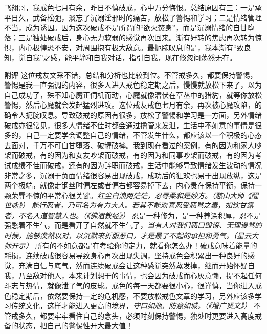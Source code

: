 \begin{case}
    飞翔哥，我戒色七月有余，昨日不慎破戒，心中万分悔恨。总结原因有三：一是承平日久，武备松弛，淡忘了沉溺淫邪时的痛苦，放松了警惕和学习；二是情绪管理不当，成为诱因。因为这次破戒不是所谓的“欲火焚身”，而是沉溺情绪的自甘堕落；三是独处破戒后，身心无力软弱的感觉再次回来。渐有好转的焦虑再次转为惊惧，内心极惶恐不安，对周围抱有极大敌意。最扼腕叹息的是，我本渐有“致良知，觉自我”之感，能平静和自我对话，指引自我，现在倏忽间荡然无存。

    \textbf{附评} 这位戒友文采不错，总结和分析也比较到位。不管戒多久，都要保持警惕，警惕是我一直强调的内容，很多人进入戒色稳定期之后，慢慢就放松下来了，以为自己成功了，殊不知心魔正伺机而动，心魔就像潜伏在草丛中的猎豹，就等你放松警惕，然后心魔就会发起猛烈进攻。这位戒友戒色七月有余，再次被心魔攻陷，的确令人扼腕叹息。导致破戒的原因有很多，放松了警惕和学习是一方面，另外情绪破戒亦很常见，很多人情绪不佳时都会通过撸管来发泄，生活中不如意的事情是很多的，自己一定要学会调整自己的情绪，不管发生什么，都应该以一个积极的心态去面对，千万不可自甘堕落、破罐破摔。我到现在看过的案例，有的因为和家人吵架而破戒，有的因为和女友吵架而破戒，有的因为和同事吵架而破戒，有的因为考试成绩不佳而破戒，还有的因为辞职而破戒，生活中能够导致情绪发生波动的情况非常之多，沉溺于负面情绪很容易出现破戒，成功后的狂欢也易于出现放纵，这是两个极端，就像走钢丝时偏左或者偏右都容易掉下去，内心贵在保持平衡，保持一颗荣辱不惊的平常心很关键。\textit{红尘白浪两茫茫，忍辱柔和是妙方。（憨山大师《醒世咏》）} \textit{能行忍者，乃可名为有力大人。若其不能欢喜忍受恶骂之毒，如饮甘露者，不名入道智慧人也。（《佛遗教经》）} 忍是一种修为，是一种养深积厚，忍不是强憋着不生气，而是看开了自然就不生气了，\textit{当有人对我们恶口毁谤、无理谩骂的时候，能够漠然以对，以沉默来折服恶口，才是最了不起的承担和勇气。（星云大师开示）} 所有的不如意都是在考验你的定力，就看你怎么办！破戒意味着能量的耗损，连续破戒很容易导致身心再次出现失调，坚持戒色会积累出一种良好的感觉，充满自信与底气，然而连续破戒会让这种感觉突然蒸发掉，继而开始怀疑自我，乃至敌对他人，本来计划想干的事情，也会因为破戒而心灰意懒，提不起任何斗志与热情，就像泄了气的皮球。戒色的每一天都要很小心，很谨慎，当你进入戒色稳定期后，依然要保持一定的危机感，不要放松戒色文章的学习，另外应该多学习传统文化，这样才能进入更高的境界，\textit{守口如瓶，防意如城。（《增广贤文》）} 不管戒多久，都要牢牢看住自己的念头，必须时刻保持警惕，独处时更要进入高度戒备的状态，把自己的警惕性开大最大值！
\end{case}


